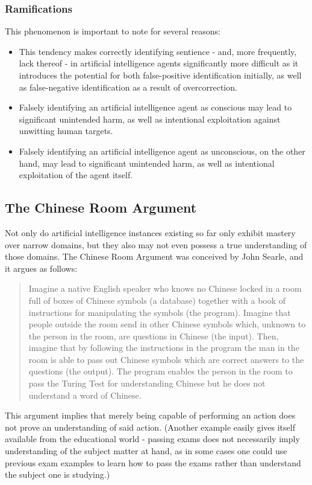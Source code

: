 \documentclass[masterthesis]{fer}
\begin{document}
\subsubsection{Ramifications}

This phenomenon is important to note for several reasons:
\begin{itemize}
\item This tendency makes correctly identifying sentience - and, more frequently, lack thereof - in artificial intelligence agents significantly more difficult as it introduces the potential for both false-positive identification initially, as well as false-negative identification as a result of overcorrection.
\item Falsely identifying an artificial intelligence agent as conscious may lead to significant unintended harm, as well as intentional exploitation against unwitting human targets.
\item Falsely identifying an artificial intelligence agent as unconscious, on the other hand, may lead to significant unintended harm, as well as intentional exploitation of the agent itself.
\end{itemize}

\subsection{The Chinese Room Argument}
Not only do artificial intelligence instances existing so far only exhibit mastery over narrow domains, but they also may not even possess a true understanding of those domains.
The Chinese Room Argument was conceived by John Searle, and it argues as follows:
\begin{quote}
Imagine a native English speaker who knows no Chinese locked in a room full of boxes of Chinese symbols (a database) together with a book of instructions for manipulating the symbols (the program). Imagine that people outside the room send in other Chinese symbols which, unknown to the person in the room, are questions in Chinese (the input). Then, imagine that by following the instructions in the program the man in the room is able to pass out Chinese symbols which are correct answers to the questions (the output). The program enables the person in the room to pass the Turing Test for understanding Chinese but he does not understand a word of Chinese.
\cite{turing1}
\end{quote}
   This argument implies that merely being capable of performing an action does not prove an understanding of said action. (Another example easily gives itself available from the educational world - passing exams does not necessarily imply understanding of the subject matter at hand, as in some cases one could use previous exam examples to learn how to pass the exams rather than understand the subject one is studying.)
\end{document}
